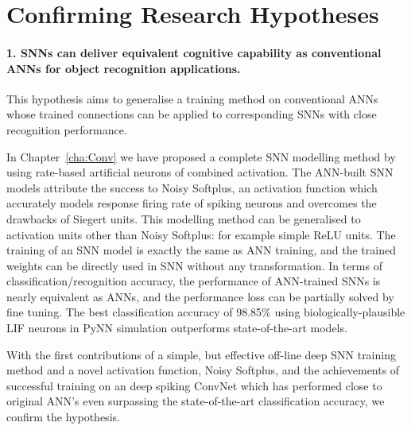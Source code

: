 \section{Confirming Research Hypotheses}
\paragraph{1. SNNs can deliver equivalent cognitive capability as conventional ANNs for object recognition applications.}
This hypothesis aims to generalise a training method on conventional ANNs whose trained connections can be applied to corresponding SNNs with close recognition performance.

In Chapter~\ref{cha:Conv} we have proposed a complete SNN modelling method by using rate-based artificial neurons of combined activation.
The ANN-built SNN models attribute the success to Noisy Softplus, an activation function which accurately models response firing rate of spiking neurons and overcomes the drawbacks of Siegert units.
This modelling method can be generalised to activation units other than Noisy Softplus: for example simple ReLU units.
The training of an SNN model is exactly the same as ANN training, and the trained weights can be directly used in SNN without any transformation.
In terms of classification/recognition accuracy, the performance of ANN-trained SNNs is nearly equivalent as ANNs, and the performance loss can be partially solved by fine tuning.
The best classification accuracy of 98.85\% using biologically-plausible LIF neurons in PyNN simulation outperforms state-of-the-art models. 

With the first contributions of a simple, but effective off-line deep SNN training method and a novel activation function, Noisy Softplus, and the achievements of successful training on an deep spiking ConvNet which has performed close to original ANN's even surpassing the state-of-the-art classification accuracy, we confirm the hypothesis. 

